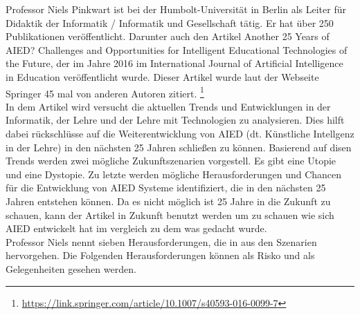 
Professor Niels Pinkwart ist bei der Humbolt-Universität in Berlin als Leiter für \glqq{} Didaktik der Informatik / Informatik und Gesellschaft\grqq{} tätig. 
Er hat über 250 Publikationen veröffentlicht. Darunter auch den Artikel \glqq{} Another 25 Years of AIED? Challenges and Opportunities for Intelligent Educational Technologies of the Future\grqq{}, der im Jahre 2016 im \glqq International Journal of Artificial Intelligence in Education\grqq{} veröffentlicht wurde.
Dieser Artikel wurde laut der Webseite Springer 45 mal von anderen Autoren zitiert. \footnote{\url{https://link.springer.com/article/10.1007/s40593-016-0099-7}}
\\ \noindent
In dem Artikel wird versucht die aktuellen Trends und Entwicklungen in der Informatik, der Lehre und der Lehre mit Technologien zu analysieren. Dies hilft dabei rückschlüsse auf die Weiterentwicklung
von \ac{AIED} (dt. Künstliche Intellgenz in der Lehre) in den nächsten 25 Jahren schließen zu können. Basierend auf disen Trends werden zwei mögliche Zukunftszenarien vorgestell.
Es gibt eine Utopie und eine Dystopie. Zu letzte werden mögliche Herausforderungen und Chancen für die Entwicklung von \ac{AIED} Systeme identifiziert, die in den nächsten 25 Jahren entstehen können. 
Da es nicht möglich ist 25 Jahre in die Zukunft zu schauen, kann der Artikel in Zukunft benutzt werden um zu schauen wie sich \ac{AIED} entwickelt hat im vergleich zu dem was gedacht wurde.
\\ \noindent
Professor Niels nennt sieben Herausforderungen, die in aus den Szenarien hervorgehen. Die Folgenden Herausforderungen können als Risko und als Gelegenheiten gesehen werden.
